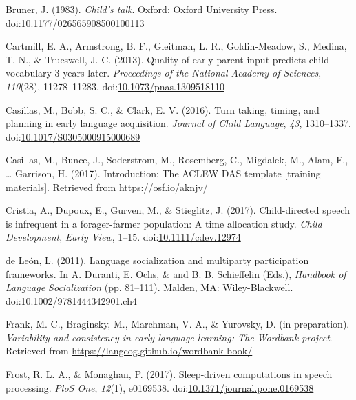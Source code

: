 \documentclass[floatsintext,man]{apa6}
\theoremstyle{definition}
\theoremstyle{definition}
\theoremstyle{definition}
\theoremstyle{remark}
\begin{document}
\hypertarget{ref-bruner1983childs}{}
Bruner, J. (1983). \emph{Child's talk}. Oxford: Oxford University Press.
doi:\href{https://doi.org/10.1177/026565908500100113}{10.1177/026565908500100113}

\hypertarget{ref-cartmill2013quality}{}
Cartmill, E. A., Armstrong, B. F., Gleitman, L. R., Goldin-Meadow, S.,
Medina, T. N., \& Trueswell, J. C. (2013). Quality of early parent input
predicts child vocabulary 3 years later. \emph{Proceedings of the
National Academy of Sciences}, \emph{110}(28), 11278--11283.
doi:\href{https://doi.org/10.1073/pnas.1309518110}{10.1073/pnas.1309518110}

\hypertarget{ref-casillas2016turn}{}
Casillas, M., Bobb, S. C., \& Clark, E. V. (2016). Turn taking, timing,
and planning in early language acquisition. \emph{Journal of Child
Language}, \emph{43}, 1310--1337.
doi:\href{https://doi.org/10.1017/S0305000915000689}{10.1017/S0305000915000689}

\hypertarget{ref-casillas2017ACLEWDAS}{}
Casillas, M., Bunce, J., Soderstrom, M., Rosemberg, C., Migdalek, M.,
Alam, F., \ldots{} Garrison, H. (2017). Introduction: The ACLEW DAS
template {[}training materials{]}. Retrieved from
\url{https://osf.io/aknjv/}

\hypertarget{ref-cristia2017child}{}
Cristia, A., Dupoux, E., Gurven, M., \& Stieglitz, J. (2017).
Child-directed speech is infrequent in a forager-farmer population: A
time allocation study. \emph{Child Development}, \emph{Early View},
1--15. doi:\href{https://doi.org/10.1111/cdev.12974}{10.1111/cdev.12974}

\hypertarget{ref-deleon2011language}{}
de León, L. (2011). Language socialization and multiparty participation
frameworks. In A. Duranti, E. Ochs, \& and B. B. Schieffelin (Eds.),
\emph{Handbook of Language Socialization} (pp. 81--111). Malden, MA:
Wiley-Blackwell.
doi:\href{https://doi.org/10.1002/9781444342901.ch4}{10.1002/9781444342901.ch4}

\hypertarget{ref-frankIPvariability}{}
Frank, M. C., Braginsky, M., Marchman, V. A., \& Yurovsky, D. (in
preparation). \emph{Variability and consistency in early language
learning: The Wordbank project}. Retrieved from
\url{https://langcog.github.io/wordbank-book/}

\hypertarget{ref-frost2017sleep}{}
Frost, R. L. A., \& Monaghan, P. (2017). Sleep-driven computations in
speech processing. \emph{PloS One}, \emph{12}(1), e0169538.
doi:\href{https://doi.org/10.1371/journal.pone.0169538}{10.1371/journal.pone.0169538}
\end{document}
